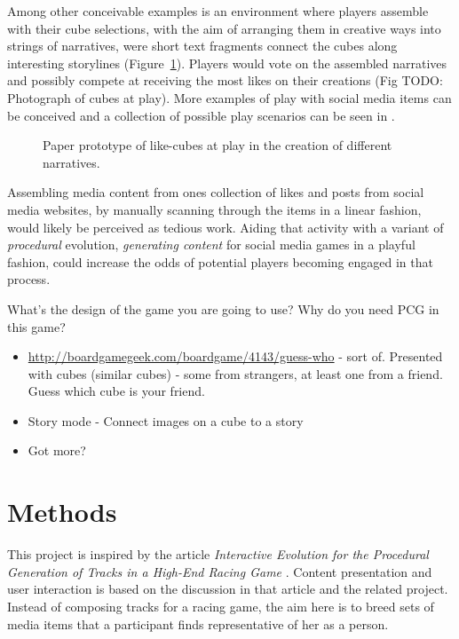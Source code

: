 \documentclass[]{article}
\begin{document}
Among other conceivable examples is an environment where players assemble with their cube selections, with the aim of arranging them in creative ways into strings of narratives, were short text fragments connect the cubes along interesting storylines (Figure~\ref{fig:narratives}).  Players would vote on the assembled narratives and possibly compete at receiving the most likes on their creations (Fig TODO: Photograph of cubes at play).  More examples of play with social media items can be conceived and a collection of possible play scenarios can be seen in \cite{GoLplay}.

\begin{figure}[htp]
	\caption{Paper prototype of like-cubes at play in the creation of different narratives.}
	\label{fig:narratives}
\end{figure}

Assembling media content from ones collection of likes and posts from social media websites, by manually scanning through the items in a linear fashion, would likely be perceived as tedious work.  Aiding that activity with a variant of \textit{procedural} evolution, \textit{generating content} for social media games in a playful fashion, could increase the odds of potential players becoming engaged in that process.


\begin{framed}
What’s the design of the game you are going to use? Why do you need PCG in this game?
\end{framed}
\begin{itemize}
\item \href{Guess who}{http://boardgamegeek.com/boardgame/4143/guess-who} - sort of. Presented with cubes (similar cubes) - some from strangers, at least one from a friend. Guess which cube is your friend.
\item Story mode - Connect images on a cube to a story
\item Got more?
\end{itemize}




\section{Methods}
\label{sec:Methods}

This project is inspired by the article \textit{Interactive Evolution for the Procedural Generation of Tracks in a High-End Racing Game} \cite{cardamone2011interactive}.  Content presentation and user interaction is based on the discussion in that article and the related project.  Instead of composing tracks for a racing game, the aim here is to breed sets of media items that a participant finds representative of her as a person.
\end{document}
